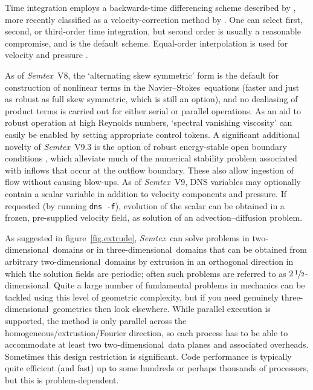 \documentclass[11pt]{report}
\newcommand{\Semtex}{\emph{Semtex}} \newcommand{\Dog}{\emph{Dog}}
\newcommand\twod{two-di\-men\-sion\-al}
\newcommand\threed{three-di\-men\-sion\-al}
\newcommand\NavSto{Navier--Stokes}
\begin{document}
Time integration employs a backwards-time differencing scheme
described by \citet{kio91}, more recently classified as a
velocity-correction method by \citet{gush03}. One can select first,
second, or third-order time integration, but second order is usually a
reasonable compromise, and is the default scheme. Equal-order
interpolation is used for velocity and pressure
\citep[see][]{gms06}. 

As of \Semtex~V8, the `alternating skew symmetric' form \citep{zan91b}
is the default for construction of nonlinear terms in the
\NavSto\ equations (faster and just as robust as full skew symmetric,
which is still an option), and no dealiasing of product terms is
carried out for either serial or parallel operations.  As an aid to
robust operation at high Reynolds numbers, `spectral vanishing
viscosity' \citep{xupa04} can easily be enabled by setting appropriate
control tokens.
%
A significant additional novelty of \Semtex~V9.3 is the option of
robust energy-stable open boundary conditions \citep{dong15}, which
alleviate much of the numerical stability problem associated with
inflows that occur at the outflow boundary.  These also allow
ingestion of flow without causing blow-ups.
%
As of \Semtex~V9, DNS variables may optionally contain a scalar
variable in addition to velocity components and pressure.  If
requested (by running \verb|dns -f|), evolution of the scalar can be
obtained in a frozen, pre-supplied velocity field, \ie as solution of
an advection--diffusion problem.

As suggested in figure~\ref{fig.extrude}, \Semtex\ can solve problems
in \twod\ domains or in \threed\ domains that can be obtained from
arbitrary \twod\ domains by extrusion in an orthogonal direction in
which the solution fields are periodic; often such problems are
referred to as $2\,\sfrac{1}{2}$-dimensional.  Quite a large number of
fundamental problems in mechanics can be tackled using this level of
geometric complexity, but if you need genuinely \threed\ geometries
then look elsewhere.  While parallel execution is supported, the
method is only parallel across the homogeneous/extrustion/Fourier
direction, so each process has to be able to accommodate at least two
\twod\ data planes and associated overheads.  Sometimes this design
restriction is significant.  Code performance is typically quite
efficient (and fast) up to some hundreds or perhaps thousands of
processors, but this is problem-dependent.
\end{document}
